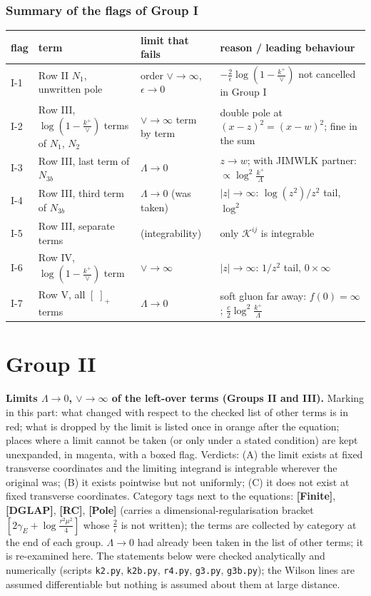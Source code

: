 \documentclass[9pt]{article}
\numberwithin{equation}{section}
\begin{document}
\subsubsection*{Summary of the flags of Group I}
\begin{center}
\begin{tabular}{|l|l|l|l|}
\hline
flag & term & limit that fails & reason / leading behaviour \\ \hline
I-1 & Row II $N_{1}$, unwritten pole & order $\vee\to\infty$, $\epsilon\to0$ & $-\frac{2}{\epsilon}\log(1-\frac{k^{+}}{\vee})$ not cancelled in Group I \\
I-2 & Row III, $\log(1-\frac{k^{+}}{\vee})$ terms of $N_{1}$, $N_{2}$ & $\vee\to\infty$ term by term & double pole at $(x-z)^{2}=(x-w)^{2}$; fine in the sum \\
I-3 & Row III, last term of $N_{3b}$ & $\Lambda\to0$ & $z\to w$; with JIMWLK partner: $\propto\log^{2}\frac{k^{+}}{\Lambda}$ \\
I-4 & Row III, third term of $N_{3b}$ & $\Lambda\to0$ (was taken) & $|z|\to\infty$: $\log(z^{2})/z^{2}$ tail, $\log^{2}$ \\
I-5 & Row III, separate terms & (integrability) & only $\mathcal{K}^{ij}$ is integrable \\
I-6 & Row IV, $\log(1-\frac{k^{+}}{\vee})$ term & $\vee\to\infty$ & $|z|\to\infty$: $1/z^{2}$ tail, $0\times\infty$ \\
I-7 & Row V, all $[\;]_{+}$ terms & $\Lambda\to0$ & soft gluon far away: $f(0)=\infty$; $\frac{c}{2}\log^{2}\frac{k^{+}}{\Lambda}$ \\ \hline
\end{tabular}
\end{center}

\section{Group II}
\noindent\textbf{Limits $\Lambda\to0$, $\vee\to\infty$ of the left-over terms (Groups II and III).} Marking in this part: what changed with respect to the checked list of other terms is in {\color{red}red}; what is dropped by the limit is listed once in {\color{orange}orange} after the equation; places where a limit cannot be taken (or only under a stated condition) are kept unexpanded, in {\color{magenta}magenta}, with a boxed flag. Verdicts: (A) the limit exists at fixed transverse coordinates and the limiting integrand is integrable wherever the original was; (B) it exists pointwise but not uniformly; (C) it does not exist at fixed transverse coordinates. Category tags next to the equations: \textbf{[Finite]}, \textbf{[DGLAP]}, \textbf{[RC]}, \textbf{[Pole]} (carries a dimensional-regularisation bracket $[2\gamma_{E}+\log\frac{r^{2}\mu^{2}}{4}]$ whose $\frac{2}{\epsilon}$ is not written); the terms are collected by category at the end of each group. $\Lambda\to0$ had already been taken in the list of other terms; it is re-examined here. The statements below were checked analytically and numerically (scripts \texttt{k2.py}, \texttt{k2b.py}, \texttt{r4.py}, \texttt{g3.py}, \texttt{g3b.py}); the Wilson lines are assumed differentiable but nothing is assumed about them at large distance.
\end{document}
